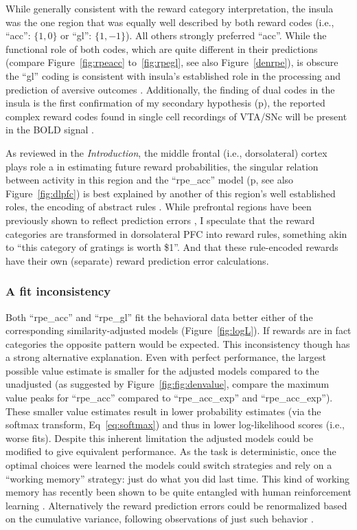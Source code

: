 \documentclass[doc,12pt]{apa}        %
\begin{document}
While generally consistent with the reward category interpretation, the insula was the one region that was equally well described by both reward codes (i.e., ``acc'': $\{1,0\}$ or ``gl'': $\{1,-1\}$).  All others strongly preferred ``acc''.  While the functional role of both codes, which are quite different in their predictions (compare Figure~\ref{fig:rpeacc} to~\ref{fig:rpegl}, see also Figure~\ref{denrpe}), is obscure the ``gl'' coding is consistent with insula's established role in the processing and prediction of aversive outcomes \cite{Chua:1999p9833,Phillips:1998p9834,Buchel:1998p9836,Elliott:2000p1637}.  Additionally, the finding of dual codes in the insula is the first confirmation of my secondary hypothesis (p\pageref{subsub:codesandfits}), the reported complex reward codes found in single cell recordings of VTA/SNc will be present in the BOLD signal \cite{Kim:2006p1063,Matsumoto:2009p7219,Smith:2011p8133}.

As reviewed in the \emph{Introduction}, the middle frontal (i.e., dorsolateral) cortex plays role a in estimating future reward probabilities, the singular relation between activity in this region and the ``rpe\_acc'' model (p\pageref{subsub:onsheet}, see also Figure~\ref{fig:dlpfc}) is best explained by another of this region's well established roles, the encoding of abstract rules \cite{Wallis:2001p8129}.  While prefrontal regions have been previously shown to reflect prediction errors \cite{Ramnani:2004p5390}, I speculate that the reward categories are transformed in dorsolateral PFC into reward rules, something akin to ``this category of gratings is worth \$1''.  And that these rule-encoded rewards have their own (separate) reward prediction error calculations.

\subsubsection{A fit inconsistency}
\label{subsub:inconsistency}
Both ``rpe\_acc'' and ``rpe\_gl'' fit the behavioral data better either of the corresponding similarity-adjusted models (Figure~\ref{fig:logL}).  If rewards are in fact categories the opposite pattern would be expected.  This inconsistency though has a strong alternative explanation.  Even with perfect performance, the largest possible value estimate is smaller for the adjusted models compared to the unadjusted (as suggested by Figure~\ref{fig:fig:denvalue}, compare the maximum value peaks for ``rpe\_acc'' compared to ``rpe\_acc\_exp'' and ``rpe\_acc\_exp'').  These smaller value estimates result in lower probability estimates (via the softmax transform, Eq~\ref{eq:softmax}) and thus in lower log-likelihood scores (i.e., worse fits).  Despite this inherent limitation the adjusted models could be modified to give equivalent performance.  As the task is deterministic, once the optimal choices were learned the models could switch strategies and rely on a ``working memory'' strategy: just do what you did last time.  This kind of working memory has recently been shown to be quite entangled with human reinforcement learning \cite{Collins:2012p9779}.  Alternatively the reward prediction errors could be renormalized based on the cumulative variance, following observations of just such behavior \cite{Tobler:2005p6373}.
\end{document}
